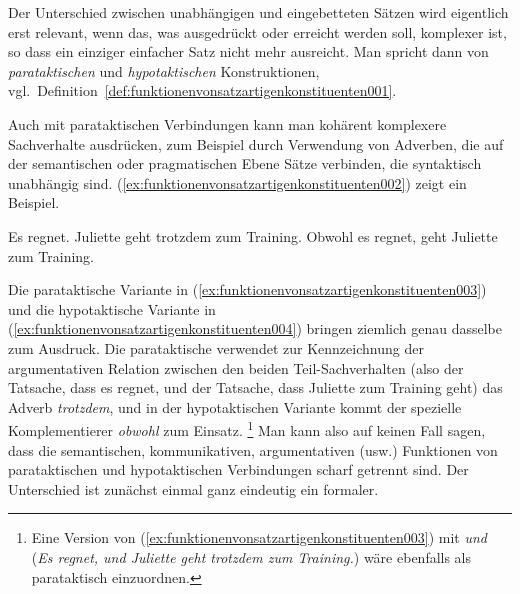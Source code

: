 Der Unterschied zwischen unabhängigen und eingebetteten Sätzen wird eigentlich erst relevant, wenn das, was ausgedrückt oder erreicht werden soll, komplexer ist, so dass ein einziger einfacher Satz nicht mehr ausreicht.
Man spricht dann von \textit{parataktischen} und \textit{hypotaktischen} Konstruktionen, vgl.\ Definition~\ref{def:funktionenvonsatzartigenkonstituenten001}.


Auch mit parataktischen Verbindungen kann man kohärent komplexere Sachverhalte ausdrücken, zum Beispiel durch Verwendung von Adverben, die auf der semantischen oder pragmatischen Ebene Sätze verbinden, die syntaktisch unabhängig sind.
(\ref{ex:funktionenvonsatzartigenkonstituenten002}) zeigt ein Beispiel.

\begin{exe}
  \ex\label{ex:funktionenvonsatzartigenkonstituenten002} 
  \begin{xlist}
    \ex\label{ex:funktionenvonsatzartigenkonstituenten003} Es regnet. Juliette geht trotzdem zum Training.
    \ex\label{ex:funktionenvonsatzartigenkonstituenten004} Obwohl es regnet, geht Juliette zum Training.
  \end{xlist}
\end{exe}

Die parataktische Variante in (\ref{ex:funktionenvonsatzartigenkonstituenten003}) und die hypotaktische Variante in (\ref{ex:funktionenvonsatzartigenkonstituenten004}) bringen ziemlich genau dasselbe zum Ausdruck.
Die parataktische verwendet zur Kennzeichnung der argumentativen Relation zwischen den beiden Teil-Sachverhalten (also der Tatsache, dass es regnet, und der Tatsache, dass Juliette zum Training geht) das Adverb \textit{trotzdem}, und in der hypotaktischen Variante kommt der spezielle Komplementierer \textit{obwohl} zum Einsatz.%
\footnote{Eine Version von (\ref{ex:funktionenvonsatzartigenkonstituenten003}) mit \textit{und} (\textit{Es regnet, und Juliette geht trotzdem zum Training.}) wäre ebenfalls als parataktisch einzuordnen.}
Man kann also auf keinen Fall sagen, dass die semantischen, kommunikativen, argumentativen (usw.) Funktionen von parataktischen und hypotaktischen Verbindungen scharf getrennt sind.
Der Unterschied ist zunächst einmal ganz eindeutig ein formaler.

